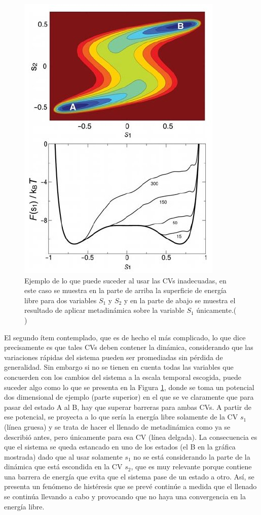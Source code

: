 \documentclass [11pt]{article}
\begin{document}
\begin{figure}[t]
\centering
\includegraphics[width=0.6\linewidth]{CVs}
\caption{Ejemplo de lo que puede suceder al usar las CVs inadecuadas, en este caso se muestra en la parte de arriba la superficie de energía libre para dos variables $S_1$ y $S_2$ y en la parte de abajo se muestra el resultado de aplicar metadinámica sobre la variable $S_1$ únicamente.({\color{red} \cite{barducci}})}
\label{error_CV}
\end{figure}

El segundo ítem contemplado, que es de hecho el más complicado, lo que dice precisamente es que tales CVs deben contener la dinámica, considerando que las variaciones rápidas del sistema pueden ser promediadas sin pérdida de generalidad. Sin embargo si no se tienen en cuenta todas las variables que concuerden con los cambios del sistema a la escala temporal escogida, puede suceder algo como lo que se presenta en la Figura \ref{error_CV}, donde se toma un potencial dos dimensional de ejemplo (parte superior) en el que se ve claramente que para pasar del estado A al B, hay que superar barreras para ambas CVs. A partir de ese potencial, se proyecta a lo que sería la energía libre solamente de la CV $s_1$ (línea gruesa) y se trata de hacer el llenado de metadinámica como ya se describió antes, pero únicamente para esa CV (línea delgada). La consecuencia es que el sistema se queda estancado en uno de los estados (el B en la gráfica mostrada) dado que al usar solamente $s_1$ no se está considerando la parte de la dinámica que está escondida en la CV $s_2$, que es muy relevante porque contiene una barrera de energía que evita que el sistema pase de un estado a otro. Así, se presenta un fenómeno de histéresis que se prevé continúe a medida que el llenado se continúa llevando a cabo y provocando que no haya una convergencia en la energía libre.
\end{document}
